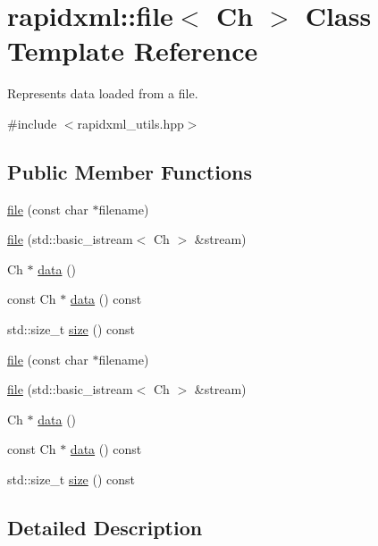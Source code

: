 \hypertarget{classrapidxml_1_1file}{}\section{rapidxml\+:\+:file$<$ Ch $>$ Class Template Reference}
\label{classrapidxml_1_1file}


Represents data loaded from a file.  




{\ttfamily \#include $<$rapidxml\+\_\+utils.\+hpp$>$}

\subsection*{Public Member Functions}
\begin{DoxyCompactItemize}
\item 
\mbox{\hyperlink{classrapidxml_1_1file_ae881a3cab1fe7152d45c92a8d7606cb3}{file}} (const char $\ast$filename)
\item 
\mbox{\hyperlink{classrapidxml_1_1file_a90707ccd991cc392dcf4bef37eed9d1f}{file}} (std\+::basic\+\_\+istream$<$ Ch $>$ \&stream)
\item 
Ch $\ast$ \mbox{\hyperlink{classrapidxml_1_1file_af1c71d65862c7af14e4708e32a80c1de}{data}} ()
\item 
const Ch $\ast$ \mbox{\hyperlink{classrapidxml_1_1file_a044bdd99e59157b8a5a1b28c2f32da4d}{data}} () const
\item 
std\+::size\+\_\+t \mbox{\hyperlink{classrapidxml_1_1file_aacd451b3def3ad056fe8342dccee35cd}{size}} () const
\item 
\mbox{\hyperlink{classrapidxml_1_1file_ae881a3cab1fe7152d45c92a8d7606cb3}{file}} (const char $\ast$filename)
\item 
\mbox{\hyperlink{classrapidxml_1_1file_a90707ccd991cc392dcf4bef37eed9d1f}{file}} (std\+::basic\+\_\+istream$<$ Ch $>$ \&stream)
\item 
Ch $\ast$ \mbox{\hyperlink{classrapidxml_1_1file_af1c71d65862c7af14e4708e32a80c1de}{data}} ()
\item 
const Ch $\ast$ \mbox{\hyperlink{classrapidxml_1_1file_a044bdd99e59157b8a5a1b28c2f32da4d}{data}} () const
\item 
std\+::size\+\_\+t \mbox{\hyperlink{classrapidxml_1_1file_aacd451b3def3ad056fe8342dccee35cd}{size}} () const
\end{DoxyCompactItemize}


\subsection{Detailed Description}
